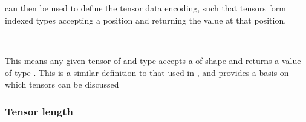 \begin{AgdaAlign}
\begin{code}%
%
\>[2]\AgdaSpace{}%
\AgdaSpace{}%
\AgdaSymbol{:}\AgdaSpace{}%
\AgdaSpace{}%
\AgdaSpace{}%
\AgdaSpace{}%
\<%
\\
\>[2][@{}l@{\AgdaIndent{0}}]%
\>[4]%
\>[8]\AgdaSymbol{:}\AgdaSpace{}%
\AgdaSpace{}%
\AgdaSpace{}%
\AgdaSpace{}%
\AgdaSpace{}%
\AgdaSymbol{(}\AgdaSpace{}%
\AgdaSymbol{)}\<%
\\
%
\>[4]\AgdaSpace{}%
\AgdaSymbol{:}\AgdaSpace{}%
\AgdaSpace{}%
\AgdaSpace{}%
\AgdaSpace{}%
\AgdaSpace{}%
\AgdaSpace{}%
\AgdaSpace{}%
\AgdaSpace{}%
\AgdaSymbol{(}\AgdaSpace{}%
\AgdaSpace{}%
\AgdaSymbol{)}\<%
\end{code}

 can then be used to define the tensor data encoding, such that
tensors form indexed types
accepting a position and returning the value at that position.

\begin{code}%
%
\>[2]\AgdaSpace{}%
\AgdaSymbol{:}\AgdaSpace{}%
\AgdaSpace{}%
\AgdaSpace{}%
\AgdaSpace{}%
\AgdaSpace{}%
\<%
\\
%
\>[2]\AgdaSpace{}%
\AgdaSpace{}%
\AgdaSpace{}%
\AgdaSymbol{=}\AgdaSpace{}%
\AgdaSpace{}%
\AgdaSpace{}%
\AgdaSpace{}%
\<%
\end{code}
This means any given tensor of   and type  accepts a
 of shape  and returns a value of type .
This is a similar definition to that used in \cite{BlockedSinkarovs}, and
provides a basis on which tensors can be discussed
\end{AgdaAlign}
\subsubsection{Tensor length}

